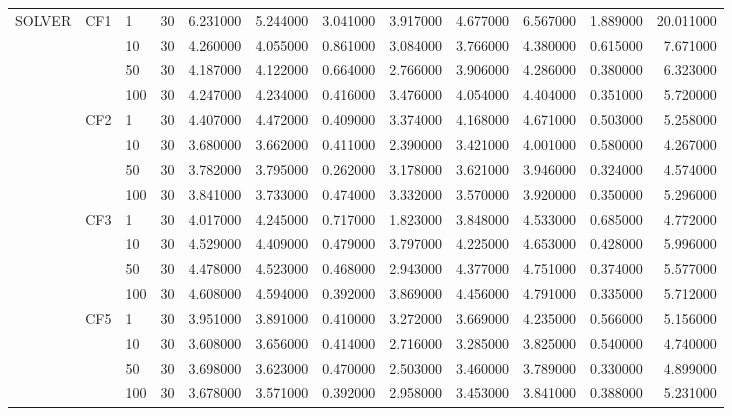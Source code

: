 \begin{tabular}{lllrrrrrrrrr}
\cline{1-12} \cline{2-12}
\multirow[t]{16}{*}{SOLVER} & \multirow[t]{4}{*}{CF1} & 1 & 30 & 6.231000 & 5.244000 & 3.041000 & 3.917000 & 4.677000 & 6.567000 & 1.889000 & 20.011000 \\
 &  & 10 & 30 & 4.260000 & 4.055000 & 0.861000 & 3.084000 & 3.766000 & 4.380000 & 0.615000 & 7.671000 \\
 &  & 50 & 30 & 4.187000 & 4.122000 & 0.664000 & 2.766000 & 3.906000 & 4.286000 & 0.380000 & 6.323000 \\
 &  & 100 & 30 & 4.247000 & 4.234000 & 0.416000 & 3.476000 & 4.054000 & 4.404000 & 0.351000 & 5.720000 \\
\cline{2-12}
 & \multirow[t]{4}{*}{CF2} & 1 & 30 & 4.407000 & 4.472000 & 0.409000 & 3.374000 & 4.168000 & 4.671000 & 0.503000 & 5.258000 \\
 &  & 10 & 30 & 3.680000 & 3.662000 & 0.411000 & 2.390000 & 3.421000 & 4.001000 & 0.580000 & 4.267000 \\
 &  & 50 & 30 & 3.782000 & 3.795000 & 0.262000 & 3.178000 & 3.621000 & 3.946000 & 0.324000 & 4.574000 \\
 &  & 100 & 30 & 3.841000 & 3.733000 & 0.474000 & 3.332000 & 3.570000 & 3.920000 & 0.350000 & 5.296000 \\
\cline{2-12}
 & \multirow[t]{4}{*}{CF3} & 1 & 30 & 4.017000 & 4.245000 & 0.717000 & 1.823000 & 3.848000 & 4.533000 & 0.685000 & 4.772000 \\
 &  & 10 & 30 & 4.529000 & 4.409000 & 0.479000 & 3.797000 & 4.225000 & 4.653000 & 0.428000 & 5.996000 \\
 &  & 50 & 30 & 4.478000 & 4.523000 & 0.468000 & 2.943000 & 4.377000 & 4.751000 & 0.374000 & 5.577000 \\
 &  & 100 & 30 & 4.608000 & 4.594000 & 0.392000 & 3.869000 & 4.456000 & 4.791000 & 0.335000 & 5.712000 \\
\cline{2-12}
 & \multirow[t]{4}{*}{CF5} & 1 & 30 & 3.951000 & 3.891000 & 0.410000 & 3.272000 & 3.669000 & 4.235000 & 0.566000 & 5.156000 \\
 &  & 10 & 30 & 3.608000 & 3.656000 & 0.414000 & 2.716000 & 3.285000 & 3.825000 & 0.540000 & 4.740000 \\
 &  & 50 & 30 & 3.698000 & 3.623000 & 0.470000 & 2.503000 & 3.460000 & 3.789000 & 0.330000 & 4.899000 \\
 &  & 100 & 30 & 3.678000 & 3.571000 & 0.392000 & 2.958000 & 3.453000 & 3.841000 & 0.388000 & 5.231000 \\
\cline{1-12} \cline{2-12}
\bottomrule
\end{tabular}
